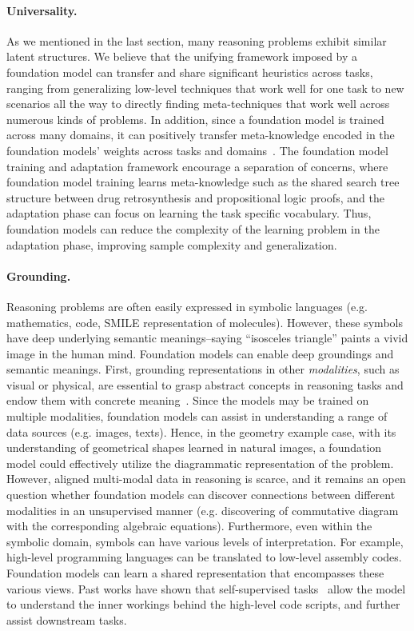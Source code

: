 \paragraph{Universality.} As we mentioned in the last section, many reasoning problems exhibit similar latent structures. We believe that the unifying framework imposed by a foundation model can transfer and share significant heuristics across tasks, ranging from generalizing low-level techniques that work well for one task to new scenarios all the way to directly finding meta-techniques that work well across numerous kinds of problems. In addition, since a foundation model is trained across many domains, it can positively transfer meta-knowledge encoded in the foundation models' weights across tasks and domains~\citep{papadimitriou2020learning, lime,DBLP:journals/corr/abs-2103-05247}. The foundation model training and adaptation framework encourage a separation of concerns, where foundation model training learns meta-knowledge such as the shared search tree structure between drug retrosynthesis and propositional logic proofs, and the adaptation phase can focus on learning the task specific vocabulary. Thus, foundation models can reduce the complexity of the learning problem in the adaptation phase, improving sample complexity and generalization.

\paragraph{Grounding.} Reasoning problems are often easily expressed in symbolic languages (e.g. mathematics, code, SMILE representation of molecules). However, these symbols have deep underlying semantic meanings--saying ``isosceles triangle'' paints a vivid image in the human mind. Foundation models can enable deep groundings and semantic meanings. First, grounding representations in other \emph{modalities}, such as visual or physical, are essential to grasp abstract concepts in reasoning tasks and endow them with concrete meaning~\citep{Larkin1987Simon,Jamnik2001MathematicalRW}. Since the models may be trained on multiple modalities, foundation models can assist in understanding a range of data sources (e.g. images, texts). Hence, in the geometry example case, with its understanding of geometrical shapes learned in natural images, a foundation model could effectively utilize the diagrammatic representation of the problem. However, aligned multi-modal data in reasoning is scarce, and it remains an open question whether foundation models can discover connections between different modalities in an unsupervised manner (e.g. discovering of commutative diagram with the corresponding algebraic equations). Furthermore, even within the symbolic domain, symbols can have various levels of interpretation. For example, high-level programming languages can be translated to low-level assembly codes. Foundation models can learn a shared representation that encompasses these various views. Past works have shown that self-supervised tasks~\citep{pact, DBLP:journals/corr/abs-2105-04297,DBLP:journals/corr/abs-2103-03809} allow the model to understand the inner workings behind the high-level code scripts, and further assist downstream tasks. 

